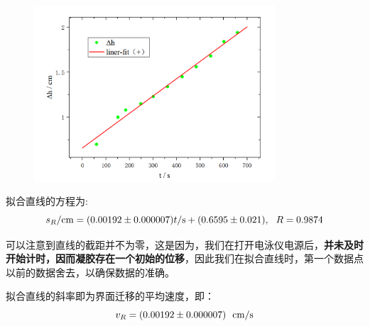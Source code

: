 \documentclass[12pt]{article}
\begin{document}
		\begin{figure}[!h]
			\centering
			\includegraphics[width=0.80\textwidth]{3.png}
		\end{figure}
		\par
		拟合直线的方程为:
		$$
		s_{R}/{\rm cm}=(0.00192\pm 0.000007)t/{\rm s}+(0.6595\pm 0.021),\   \  R=0.9874
		$$
		\par
		可以注意到直线的截距并不为零，这是因为，我们在打开电泳仪电源后，\textbf{并未及时开始计时，因而凝胶存在一个初始的位移}，因此我们在拟合直线时，第一个数据点以前的数据舍去，以确保数据的准确。\par
		拟合直线的斜率即为界面迁移的平均速度，即：
		$$
		v_{R} = (0.00192\pm 0.000007)\ \ \rm cm/s
		$$
\end{document}
